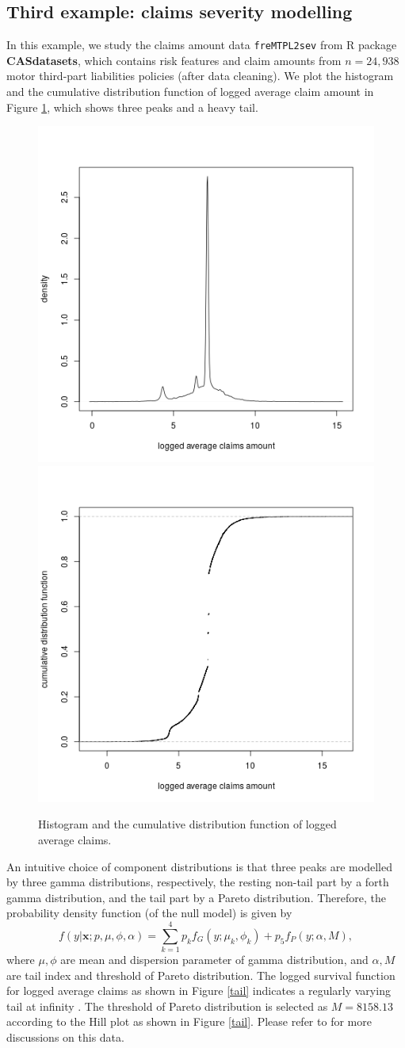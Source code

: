 \documentclass[11pt]{article}
\numberwithin{equation}{section}
\def\bx{\boldsymbol{x}}
\begin{document}
\subsection{Third example: claims severity modelling}\label{sec:third example}
In this example, we study the claims amount data {\tt freMTPL2sev} from R package {\bf CASdatasets}, which contains risk features and  claim amounts from $n=24,938$ motor third-part liabilities policies (after data cleaning). 
We plot the histogram and the cumulative distribution function of logged average claim  amount in Figure \ref{hist}, which shows three peaks and a heavy tail. 
	\begin{figure}[h!]
		\centering
		\includegraphics[width=0.4\linewidth]{../plots/sev/hist.png}
		\includegraphics[width=0.4\linewidth]{../plots/sev/cdf.png}
		\caption{Histogram and the cumulative distribution function of logged average claims.}\label{hist}
	\end{figure}
An intuitive choice of component distributions is that 
three peaks are modelled by three gamma distributions, respectively, the resting non-tail part by a forth gamma distribution, and the tail part by a Pareto distribution.
Therefore, the probability density function (of the null model) is given by
\begin{equation}\label{sev-0}
	f(y|\bx;p,\mu,\phi,\alpha)=\sum_{k=1}^4p_kf_{G}(y;\mu_k,\phi_k)+p_5f_{P}(y;\alpha,M),
\end{equation}
	where $\mu,\phi$ are mean and dispersion parameter of gamma distribution, and $\alpha, M$ are tail index and threshold of Pareto distribution. 
	The logged survival function for logged average claims as shown in Figure \ref{tail} indicates a regularly varying  tail at infinity \citep{embrechts2013modelling}.
	The threshold of Pareto distribution is selected as $M=8158.13$ according to the Hill plot \citep{resnick1997heavy} as shown in Figure \ref{tail}. Please refer to \citet{wuthrich2022statistical} for more discussions on this data.
	
\end{document}
